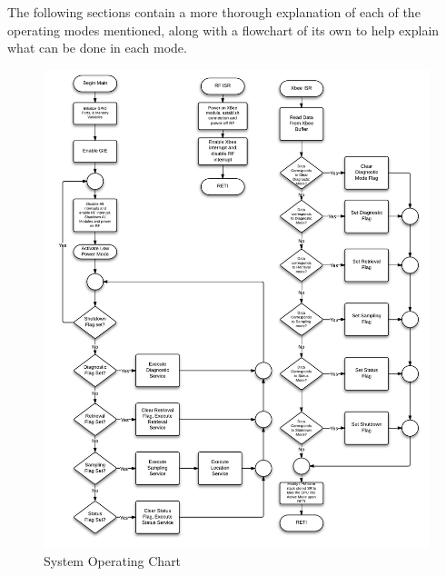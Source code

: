 The following sections contain a more thorough explanation of each of the operating modes mentioned, along with a flowchart of its own to help explain what can be done in each mode.
\begin{figure}[H]
	\centering
	\includegraphics[width=\textwidth]{img/SystemFlowchart}
	\caption{System Operating Chart \label{fig:systemFlowchart}}
\end{figure}

